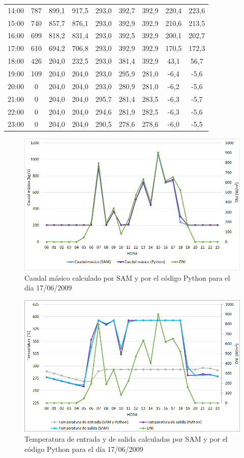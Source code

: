 \begin{table}[]
{\begin{tabular}{ccccccccc}
14:00 & 787 & 899,1 & 917,5 & 293,0 & 392,7 & 392,9 & 220,4 & 223,6 \\
15:00 & 740 & 857,7 & 876,1 & 293,0 & 392,9 & 392,9 & 210,6 & 213,5 \\
16:00 & 699 & 818,2 & 831,4 & 293,0 & 392,5 & 392,9 & 200,1 & 202,7 \\
17:00 & 610 & 694,2 & 706,8 & 293,0 & 392,9 & 392,9 & 170,5 & 172,3 \\
18:00 & 426 & 204,0 & 232,5 & 293,0 & 381,4 & 392,9 & 43,1  & 56,7  \\
19:00 & 109 & 204,0 & 204,0 & 293,0 & 295,9 & 281,0 & -6,4  & -5,6  \\
20:00 & 0   & 204,0 & 204,0 & 293,0 & 280,9 & 281,0 & -6,2  & -5,6  \\
21:00 & 0   & 204,0 & 204,0 & 295,7 & 281,4 & 283,5 & -6,3  & -5,7  \\
22:00 & 0   & 204,0 & 204,0 & 294,6 & 281,9 & 282,5 & -6,3  & -5,6  \\
23:00 & 0   & 204,0 & 204,0 & 290,5 & 278,6 & 278,6 & -6,0  & -5,5 
\end{tabular}%
}
\end{table}

\begin{figure}
\includegraphics[width=0.9\linewidth]{images/176caudal.png}
\caption{Caudal másico calculado por SAM y por el código Python para el día 17/06/2009} 
\label{fig:176caudal}
\end{figure}

\begin{figure}
\includegraphics[width=0.9\linewidth]{images/176temperatura.png}
\caption{Temperatura de entrada y de salida calculadas por SAM y por el código Python para el día 17/06/2009} 
\label{fig:176temperatura}
\end{figure}

